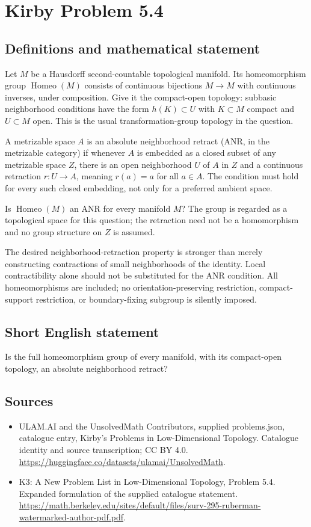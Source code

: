 \documentclass[11pt,a4paper]{article}
\begin{document}
\section*{Kirby Problem 5.4}\label{statement}

\subsection{Definitions and mathematical statement}
Let $M$ be a Hausdorff second-countable topological manifold.
Its homeomorphism group $\operatorname{Homeo}(M)$ consists of
continuous bijections $M\to M$ with continuous inverses, under
composition. Give it the compact-open topology: subbasic
neighborhood conditions have the form $h(K)\subset U$ with
$K\subset M$ compact and $U\subset M$ open. This is the
usual transformation-group topology in the question.

A metrizable space $A$ is an absolute neighborhood retract
(ANR, in the metrizable category) if whenever $A$ is embedded
as a closed subset of any metrizable space $Z$, there is an
open neighborhood $U$ of $A$ in $Z$ and a continuous
retraction $r:U\to A$, meaning $r(a)=a$ for all $a\in A$.
The condition must hold for every such closed embedding, not
only for a preferred ambient space.

Is $\operatorname{Homeo}(M)$ an ANR for every manifold $M$?
The group is regarded as a topological space for this question;
the retraction need not be a homomorphism and no group structure
on $Z$ is assumed.

The desired neighborhood-retraction property is stronger than
merely constructing contractions of small neighborhoods of the
identity. Local contractibility alone should not be substituted
for the ANR condition. All homeomorphisms are included; no
orientation-preserving restriction, compact-support restriction, or
boundary-fixing subgroup is silently imposed.
\subsection{Short English statement}
Is the full homeomorphism group of every manifold, with its compact-open topology, an absolute neighborhood retract?
\subsection{Sources}
\begin{itemize}
\item[S1] ULAM.AI and the UnsolvedMath Contributors, supplied problems.json, catalogue entry, Kirby's Problems in Low-Dimensional Topology. Catalogue identity and source transcription; CC BY 4.0.
\url{https://huggingface.co/datasets/ulamai/UnsolvedMath}.
\item[S2] K3: A New Problem List in Low-Dimensional Topology, Problem 5.4. Expanded formulation of the supplied catalogue statement.
\url{https://math.berkeley.edu/sites/default/files/surv-295-ruberman-watermarked-author-pdf.pdf}.
\end{itemize}
\end{document}
